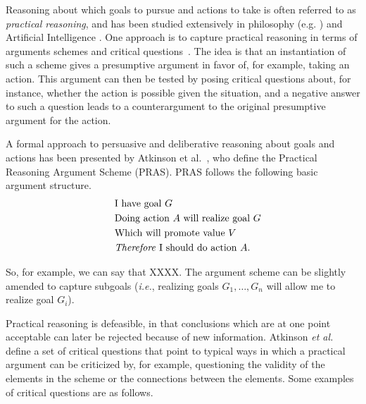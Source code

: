 
Reasoning about which goals to pursue and actions to take is often referred to as \emph{practical reasoning}, and has been studied extensively in philosophy (e.g. \cite{raz1978, walton1990}) and Artificial Intelligence \cite{bratman1987, atkinson2007}. One approach is to capture practical reasoning in terms of arguments schemes and critical questions~\cite{walton1990}. The idea is that an instantiation of such a scheme gives a presumptive argument in favor of, for example, taking an action. This argument can then be tested by posing critical questions about, for instance, whether the action is possible given the situation, and a negative answer to such a question leads to a counterargument to the original presumptive argument for the action. 

A formal approach to persuasive and deliberative reasoning about goals and actions has been presented by Atkinson et al.~\cite{atkinson2007}, who define the Practical Reasoning Argument Scheme (PRAS). PRAS follows the following basic argument structure. 
\begin{equation}
\label{eq:eq1}
  \begin{aligned}
 \qquad&\text{I have goal } G&\\
&\text{Doing action }A \text{ will realize goal }G&\\
&\text{Which will promote value }V&\\
&\text{\emph{Therefore} I should do action }A.&
  \end{aligned}
\end{equation}

So, for example, we can say that XXXX. The argument scheme can be slightly amended to capture subgoals (\emph{i.e.}, realizing goals $G_1, \ldots, G_n$ will allow me to realize goal $G_i$). 

Practical reasoning is defeasible, in that conclusions which are at one point acceptable can later be rejected because of new information. Atkinson \emph{et al.}~\cite{atkinson2007} define a set of critical questions that point to typical ways in which a practical argument can be criticized by, for example, questioning the validity of the elements in the scheme or the connections between the elements. Some examples of critical questions are as follows.

